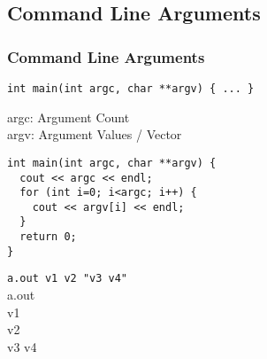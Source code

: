 \subsection{Command Line Arguments}

\begin{frame}[fragile]
\frametitle{Command Line Arguments}
\begin{lstlisting}
int main(int argc, char **argv) { ... }
\end{lstlisting}
argc: Argument Count\\
argv: Argument Values / Vector
\vspace{3mm}
{\tiny
\begin{lstlisting}
int main(int argc, char **argv) {
  cout << argc << endl;
  for (int i=0; i<argc; i++) {
	cout << argv[i] << endl;
  }
  return 0;
}
\end{lstlisting}
\verb|a.out v1 v2 "v3 v4"|\\
\vspace{3mm}
a.out\\
v1\\
v2\\
v3 v4\\
}
\end{frame}
